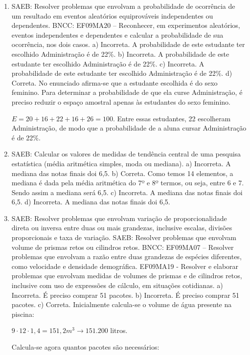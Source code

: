 \begin{enumerate}
\item
SAEB: Resolver problemas que envolvam a probabilidade de
ocorrência de um resultado em eventos aleatórios equiprováveis
independentes ou dependentes.
BNCC: EF09MA20 -- Reconhecer, em experimentos aleatórios, eventos
independentes e dependentes e calcular a probabilidade de sua
ocorrência, nos dois casos.
a) Incorreta. A probabilidade de este estudante ter escolhido Administração é de 22\%.
b) Incorreta. A probabilidade de este estudante ter escolhido Administração é de 22\%.
c) Incorreta. A probabilidade de este estudante ter escolhido Administração é de 22\%.
d) Correta. No enunciado afirma-se que a estudante escolhida é do sexo feminino. Para
determinar a probabilidade de que ela curse Administração, é preciso
reduzir o espaço amostral apenas às estudantes do sexo 
feminino.

$E = 20 + 16 + 22 +16 + 26 = 100$. Entre essas estudantes, 22 escolheram 
Administração, de modo que a probabilidade de a aluna cursar Administração é de
22\%.

\item
SAEB: Calcular os valores de medidas de tendência central de uma
pesquisa estatística (média aritmética simples, moda ou mediana).
a) Incorreta. A mediana das notas finais doi 6,5.
b) Correta. Como temos 14 elementos, a mediana é dada pela média aritmética do 7º e
8º termos, ou seja, entre 6 e 7. Sendo assim a mediana será 6,5.
c) Incorreta. A mediana das notas finais doi 6,5.
d) Incorreta. A mediana das notas finais doi 6,5.

\item
SAEB: Resolver problemas que envolvam variação de
proporcionalidade direta ou inversa entre duas ou mais grandezas,
inclusive escalas, divisões proporcionais e taxa de variação.
SAEB: Resolver problemas que envolvam volume de prismas retos ou
cilindros retos.
BNCC: EF09MA07 -- Resolver problemas que envolvam a razão entre
duas grandezas de espécies diferentes, como velocidade e densidade
demográfica.
EF09MA19 - Resolver e elaborar problemas que envolvam medidas de volumes
de prismas e de cilindros retos, inclusive com uso de expressões de
cálculo, em situações cotidianas.
a) Incorreta. É preciso comprar 51 pacotes. 
b) Incorreta. É preciso comprar 51 pacotes. 
c) Correta. Inicialmente calcula-se o volume de água presente na piscina:

$9 \cdot 12 \cdot 1,4 = 151,2 m^3 \rightarrow 151.200$ litros. 

Calcula-se agora quantos pacotes são necessários: 


\end{enumerate}
